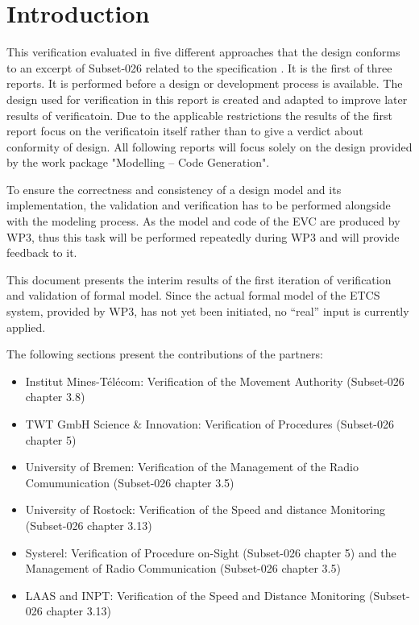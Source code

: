 \documentclass{template/openetcs_article}
\begin{document}
\section{Introduction}
This verification evaluated in five different approaches that the design conforms to an excerpt of Subset-026 \cite{unisig_subset-026_2012}  related to the specification \cite{tsi-2012-88-eu} \cite{tsi-2012-696-eu}.  It is the first of three reports. It is performed before a design or development process is available. The design used for verification in this report is created and adapted to improve later results of verificatoin. Due to the applicable restrictions the results of the first report focus on the verificatoin itself rather than to give a verdict about conformity of design. All following reports will focus solely on the design provided by the work package "Modelling – Code Generation".

To ensure the correctness and consistency of a design model and its implementation, the
validation and verification has to be performed alongside with the modeling process. 
As the model and code of the EVC are produced by WP3,
thus this task will be performed repeatedly during WP3 and will provide
feedback to it.

This document presents the interim results of the first iteration of
verification and validation of formal model.
Since the actual formal model of the ETCS system, provided by WP3, has not
yet been initiated, no ``real'' input is currently applied.

The following sections present the contributions of the partners: 
\begin{itemize}
  \item Institut Mines-Télécom: Verification of the Movement Authority (Subset-026~\cite{unisig_subset-026_2012} chapter 3.8)
  \item TWT GmbH Science \& Innovation: Verification of Procedures (Subset-026 chapter 5)
  \item University of Bremen: Verification of the Management of the Radio
  Comumunication (Subset-026 chapter 3.5)
  \item University of Rostock: Verification of the Speed and distance  Monitoring  (Subset-026 chapter 3.13)
  \item Systerel: Verification of Procedure on-Sight (Subset-026 chapter 5) and the Management of Radio Communication (Subset-026 chapter 3.5)
  \item LAAS and INPT: Verification of the Speed and Distance Monitoring (Subset-026 chapter 3.13)
\end{itemize}
\end{document}
